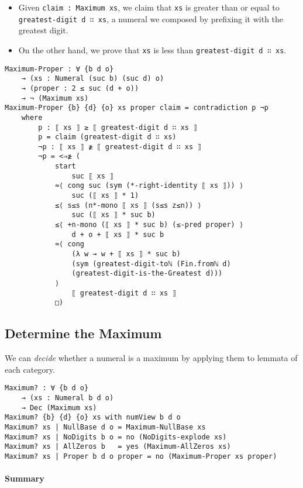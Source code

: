 \documentclass[\main/thesis.tex]{subfiles}
\begin{document}
\begin{itemize}
    \item Given {\lstinline|claim : Maximum xs|}, we claim that {\lstinline|xs|}
        is greater than or equal to {\lstinline|greatest-digit d ∷ xs|}, a numeral
        we composed by prefixing it with the greatest digit.
    \item On the other hand, we prove that {\lstinline|xs|} is less than
        {\lstinline|greatest-digit d ∷ xs|}.
\end{itemize}

\begin{lstlisting}
Maximum-Proper : ∀ {b d o}
    → (xs : Numeral (suc b) (suc d) o)
    → (proper : 2 ≤ suc (d + o))
    → ¬ (Maximum xs)
Maximum-Proper {b} {d} {o} xs proper claim = contradiction p ¬p
    where
        p : ⟦ xs ⟧ ≥ ⟦ greatest-digit d ∷ xs ⟧
        p = claim (greatest-digit d ∷ xs)
        ¬p : ⟦ xs ⟧ ≱ ⟦ greatest-digit d ∷ xs ⟧
        ¬p = <⇒≱ (
            start
                suc ⟦ xs ⟧
            ≈⟨ cong suc (sym (*-right-identity ⟦ xs ⟧)) ⟩
                suc (⟦ xs ⟧ * 1)
            ≤⟨ s≤s (n*-mono ⟦ xs ⟧ (s≤s z≤n)) ⟩
                suc (⟦ xs ⟧ * suc b)
            ≤⟨ +n-mono (⟦ xs ⟧ * suc b) (≤-pred proper) ⟩
                d + o + ⟦ xs ⟧ * suc b
            ≈⟨ cong
                (λ w → w + ⟦ xs ⟧ * suc b)
                (sym (greatest-digit-toℕ (Fin.fromℕ d)
                (greatest-digit-is-the-Greatest d)))
            ⟩
                ⟦ greatest-digit d ∷ xs ⟧
            □)
\end{lstlisting}

\subsection{Determine the Maximum}

We can \textit{decide} whether a numeral is a maximum by applying them to
lemmata of each category.

\begin{lstlisting}
Maximum? : ∀ {b d o}
    → (xs : Numeral b d o)
    → Dec (Maximum xs)
Maximum? {b} {d} {o} xs with numView b d o
Maximum? xs | NullBase d o = Maximum-NullBase xs
Maximum? xs | NoDigits b o = no (NoDigits-explode xs)
Maximum? xs | AllZeros b   = yes (Maximum-AllZeros xs)
Maximum? xs | Proper b d o proper = no (Maximum-Proper xs proper)
\end{lstlisting}

\paragraph{Summary}
\end{document}
